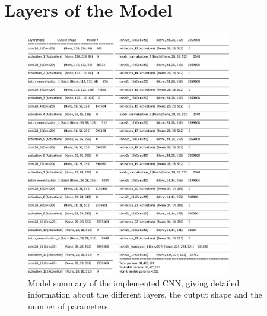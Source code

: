 \documentclass[12pt,letterpaper]{article}
\begin{document}
\section{Layers of the Model}
\begin{figure}[htb]
	\centering
	\includegraphics[width=0.8\textwidth]{layers.jpg}
	\caption{Model summary of the implemented CNN, giving detailed information about the different layers, the output shape and the number of parameters.}
	\label{modellayer}
\end{figure} 
	
\end{document}
